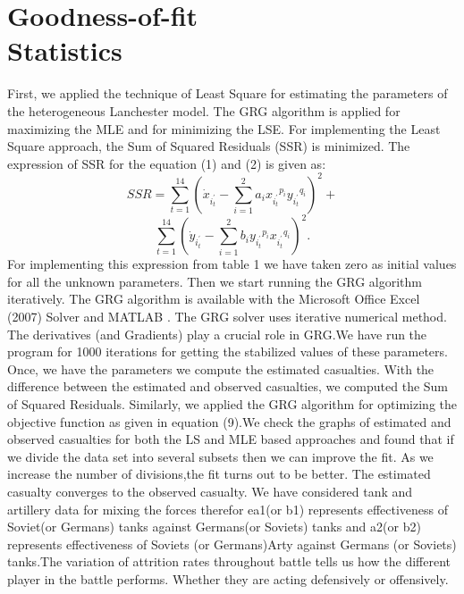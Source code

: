 \documentclass[]{article}
\begin{document}
\section{Goodness-of-fit \\Statistics}
First, we applied the technique of Least Square for estimating the parameters of the heterogeneous Lanchester model. The GRG algorithm \autocite{Excel,MATLAB} is applied for maximizing the MLE and for minimizing the LSE. For implementing the Least Square approach, the Sum of Squared Residuals (SSR) is minimized. The expression of SSR for the equation (1) and (2) is given as: 
\begin{equation}
    SSR=\sum_{t=1}^{14}{(\Dot{x}_{i^{'}_t}-\sum_{i=1}^{2}a_i{x_{i^{'}_t}}^{p_i}{y_{i^{'}_t}}^{q_i})^2}+ \nonumber
\end{equation}
\begin{equation}
    \sum_{t=1}^{14}{(\Dot{y}_{i^{'}_t}-\sum_{i=1}^{2}b_i{y_{i^{'}_t}}^{p_i}{x_{i^{'}_t}}^{q_i})^2.}
\end{equation}                                    
For implementing this expression from table 1 we have taken zero as initial values for all the unknown parameters. Then we start running the GRG algorithm iteratively. The GRG algorithm is available with the Microsoft Office Excel (2007) Solver \autocite{Excel} and MATLAB \autocite{MATLAB}. The GRG solver uses iterative numerical method. The derivatives (and Gradients) play a crucial role in GRG.We have run the program for 1000 iterations for getting the stabilized values of these parameters. Once, we have the parameters we compute the estimated casualties. With the difference between the estimated and observed casualties, we computed the Sum of Squared Residuals. Similarly, we applied the GRG algorithm for optimizing the objective function as given in equation (9).We check the graphs of estimated and observed casualties for both the LS and MLE based approaches and found that if we divide the data set into several subsets then we can improve the fit. As we increase the number of divisions,the fit turns out to be better. The estimated casualty converges to the observed casualty. We have considered tank and artillery data for mixing the forces therefor ea1(or b1) represents effectiveness of Soviet(or Germans) tanks against Germans(or Soviets) tanks and a2(or b2) represents effectiveness of Soviets (or Germans)Arty against Germans (or Soviets) tanks.The variation of attrition rates throughout battle tells us how the different player in the battle performs. Whether they are acting defensively or offensively.
\end{document}
